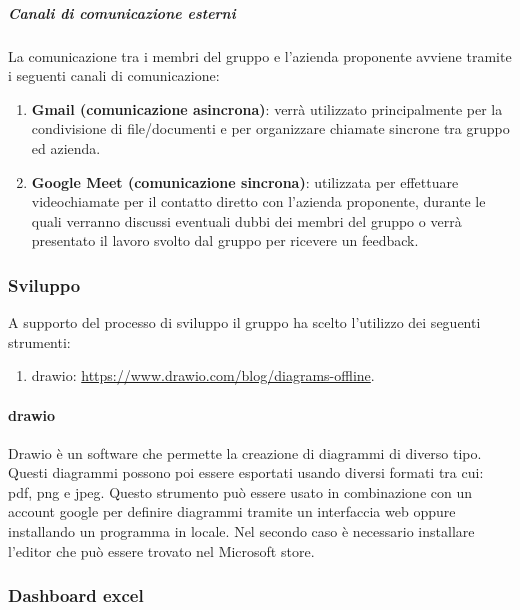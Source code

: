 \subparagraph{Canali di comunicazione esterni}
La comunicazione tra i membri del gruppo e l'azienda proponente avviene tramite i seguenti canali di comunicazione:
\begin{enumerate}
    \item \textbf{Gmail (comunicazione asincrona)}: verrà utilizzato principalmente per la condivisione di file/documenti e per organizzare chiamate sincrone tra gruppo ed azienda.

    \item \textbf{Google Meet (comunicazione sincrona)}: utilizzata per effettuare videochiamate per il contatto diretto con l'azienda proponente, durante le quali verranno discussi eventuali dubbi dei membri del gruppo o verrà presentato il lavoro svolto dal gruppo per ricevere un feedback.
\end{enumerate}

\subsubsection{Sviluppo}
A supporto del processo di sviluppo il gruppo ha scelto l'utilizzo dei seguenti strumenti:
\begin{enumerate}
    \item drawio: \href{https://www.drawio.com/blog/diagrams-offline}{https://www.drawio.com/blog/diagrams-offline}.
\end{enumerate}

\paragraph{drawio}
Drawio è un software che permette la creazione di diagrammi di diverso tipo.
Questi diagrammi possono poi essere esportati usando diversi formati tra cui: pdf, png e jpeg.
Questo strumento può essere usato in combinazione con un account google per definire diagrammi tramite un interfaccia web oppure installando un programma in locale.
Nel secondo caso è necessario installare l'editor che può essere trovato nel Microsoft store. 

\subsubsection{Dashboard excel}
\label{subpar:dashboard_excel}
